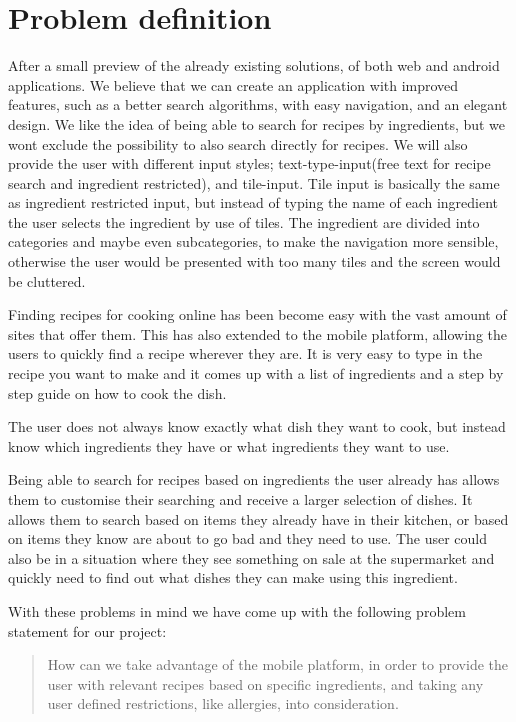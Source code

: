 \section{Problem definition}\label{sec:probdef}

After a small preview of the already existing solutions, of both web and android applications. We believe that we can create an application with improved features, such as a better search algorithms, with easy navigation, and an elegant design. We like the idea of being able to search for recipes by ingredients, but we wont exclude the possibility to also search directly for recipes. We will also provide the user with different input styles; text-type-input(free text for recipe search and ingredient restricted), and tile-input. Tile input is basically the same as ingredient restricted input, but instead of typing the name of each ingredient the user selects the ingredient by use of tiles. The ingredient are divided into categories and maybe even subcategories, to make the navigation more sensible, otherwise the user would be presented with too many tiles and the screen would be cluttered.

Finding recipes for cooking online has been become easy with the vast amount of sites that offer them. This has also extended to the mobile platform, allowing the users to quickly find a recipe wherever they are. It is very easy to type in the recipe you want to make and it comes up with a list of ingredients and a step by step guide on how to cook the dish.

The user does not always know exactly what dish they want to cook, but instead know which ingredients they have or what ingredients they want to use.

Being able to search for recipes based on ingredients the user already has allows them to customise their searching and receive a larger selection of dishes. It allows them to search based on items they already have in their kitchen, or based on items they know are about to go bad and they need to use. The user could also be in a situation where they see something on sale at the supermarket and quickly need to find out what dishes they can make using this ingredient.

With these problems in mind we have come up with the following problem statement for our project:

\begin{quote}
How can we take advantage of the mobile platform, in order to provide the user with relevant recipes based on specific ingredients, and taking any user defined restrictions, like allergies, into consideration.
\end{quote}